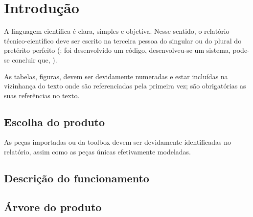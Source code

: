 \cleardoublepage\chapter{Introdução}

A linguagem científica é clara, simples e objetiva. Nesse sentido, o
relatório técnico-científico deve ser escrito na terceira pessoa do singular
ou do plural do pretérito perfeito
(\eg: foi desenvolvido um código, desenvolveu-se um sistema, pode-se
concluir que, \etc).

As tabelas, figuras, \etc devem ser devidamente numeradas e estar incluídas
na vizinhança do texto onde são referenciadas pela primeira vez; são
obrigatórias as suas referências no texto.

\section{Escolha do produto}

As peças importadas ou da toolbox devem ser devidamente identificadas no
relatório, assim como as peças únicas efetivamente modeladas.

\section{Descrição do funcionamento}

\section{Árvore do produto}



